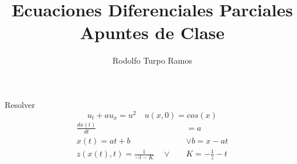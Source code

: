 \documentclass{article}
\title{Ecuaciones Diferenciales Parciales\\Apuntes de Clase}
\author{Rodolfo Turpo Ramos}
\date{\Today}
\begin{document}
Resolver
\[u_t+au_x=u^2\quad u(x,0)=cos(x)\]
\begin{align*}
    \frac{d x(t)}{dt}&=a\\
    x(t)=at+b\quad &\lor b=x-at\\
    z(x(t),t)=\frac{1}{-t-K}\quad\lor\quad &K=-\frac{1}{z}-t
\end{align*}
\end{document}
